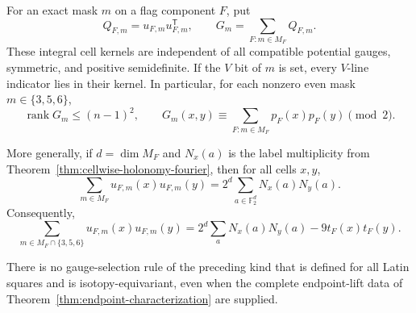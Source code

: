 \begin{theorem}
\label{thm:quadratic-gram-gauge-obstruction}
For an exact mask $m$ on a flag component $F$, put
\[
 Q_{F,m}=u_{F,m}u_{F,m}^{\mathsf T},\qquad
 G_m=\sum_{F:m\in M_F}Q_{F,m}.
\]
These integral cell kernels are independent of all compatible potential
gauges, symmetric, and positive semidefinite.  If the $V$ bit of $m$ is set,
every $V$-line indicator lies in their kernel.  In particular, for each
nonzero even mask $m\in\{3,5,6\}$,
\[
 \operatorname{rank}G_m\leq(n-1)^2,\qquad
 G_m(x,y)\equiv
 \sum_{F:m\in M_F}p_F(x)p_F(y)\pmod2.
\]

More generally, if $d=\dim M_F$ and $N_x(a)$ is the label multiplicity from
Theorem~\ref{thm:cellwise-holonomy-fourier},
then for all cells $x,y$,
\[
 \sum_{m\in M_F}u_{F,m}(x)u_{F,m}(y)
   =2^d\sum_{a\in\mathbb F_2^d}N_x(a)N_y(a).
\]
Consequently,
\[
 \sum_{m\in M_F\cap\{3,5,6\}}u_{F,m}(x)u_{F,m}(y)
 =2^d\sum_aN_x(a)N_y(a)-9t_F(x)t_F(y).             \tag{*}
\]

There is no gauge-selection rule of the preceding kind that is defined for
all Latin squares and is isotopy-equivariant, even when the complete
endpoint-lift data of Theorem~\ref{thm:endpoint-characterization} are
supplied.
\end{theorem}

